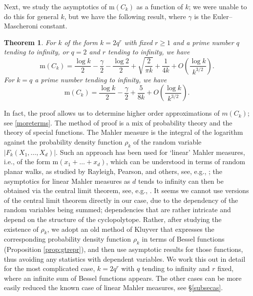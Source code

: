 \documentclass[12pt,reqno]{amsart}
\newtheorem{introtheorem}{Theorem}
\theoremstyle{definition}
\theoremstyle{plain}
\theoremstyle{definition}
\newcommand\m{\mathrm{m}}
\renewcommand{\geq}{\geqslant}
\begin{document}
Next, we study the asymptotics of $\m(C_{k})$ as a function of $k$; we were unable to do this for general $k$, but  we have the following result, where $\gamma$ is the Euler--Mascheroni constant. 

\begin{introtheorem} 
\label{mainRW} 
For $k$ of the form $k=2q^r$ with fixed $r \geq 1$ and a prime number $q$ tending to infinity, or $q=2$ and $r$ tending to infinity, we have 
\begin{equation}
\m(C_k) = \frac{\log k}{2} - \frac{\gamma}{2} - \frac{\log 2 }{2} + \sqrt{\frac{2}{\pi k }} + \frac{1}{4 k} + O\left(\frac{\log k }{k^{3/2}} \right).
\end{equation}
For $k=q$ a prime number tending to infinity, we have 
\begin{equation}
\m(C_k) = \frac{\log k}{2} - \frac{\gamma}{2} + \frac{5}{8 k} + O\left(\frac{\log k }{k^{3/2}} \right).
\end{equation}
\end{introtheorem}
In fact, the proof allows us to determine higher order approximations of $m(C_k)$; see \eqref{moreterms}.  
The method of proof is a mix of probability theory and the theory of special functions. The Mahler measure is the integral of the logarithm against the probability density function $\rho_k$ of the random variable $|F_k(X_1,\dots,X_d)|$. Such an approach has been used for  `linear' Mahler measures, i.e., of the form $\m(x_1+\dots+x_d)$, which can be understood in terms of random planar walks, as studied by Rayleigh, Pearson, and others, see, e.g., \cite{ProfWalk}; the asymptotics for linear Mahler measures as $d$ tends to infinity can then be obtained via the central limit theorem, see, e.g., \cite{MyersonSmyth}. It seems we cannot use versions of the central limit theorem directly in our case, due to the dependency of the random variables being summed; dependencies that are rather intricate and depend on the structure of the cyclopolytope. Rather, after studying the existence of $\rho_k$, we adopt an old method of Kluyver \cite{kluyver1906local} that expresses the corresponding probability density function $\rho_k$ in terms of Bessel functions (Proposition 
\ref{prop:gtrepr}), and then use asymptotic results for those functions, thus avoiding any statistics with dependent variables. We work this out in detail for the most complicated case, $k=2q^r$ with $q$ tending to infinity and $r$ fixed, where an infinite sum of Bessel functions appears. The other cases can be more easily reduced the known case of linear Mahler measures, see \S \ref{subsecas}. 
\end{document}
